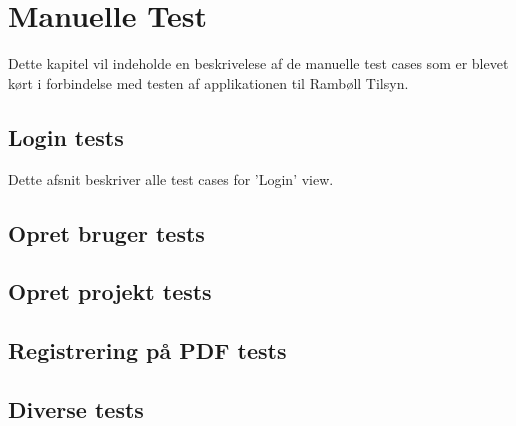 \chapter{Manuelle Test}
Dette kapitel vil indeholde en beskrivelese af de manuelle test cases som er blevet kørt i forbindelse med testen af applikationen til Rambøll Tilsyn.

\section{Login tests}
Dette afsnit beskriver alle test cases for 'Login' view.


\section{Opret bruger tests}

\section{Opret projekt tests}

\section{Registrering på PDF tests}

\section{Diverse tests}